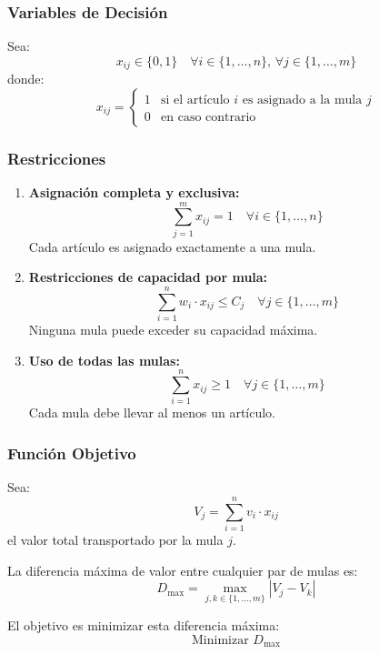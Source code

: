 \documentclass[12pt, a4paper]{article}
\begin{document}
    \subsubsection{Variables de Decisión}
    Sea:
    \[
    x_{ij} \in \{0,1\} \quad \forall i \in \{1,\ldots,n\}, \, \forall j \in \{1,\ldots,m\}
    \]
    donde:
    \[
    x_{ij} = \begin{cases}
    1 & \text{si el artículo } i \text{ es asignado a la mula } j \\
    0 & \text{en caso contrario}
    \end{cases}
    \]

    \subsubsection{Restricciones}
    \begin{enumerate}
        \item \textbf{Asignación completa y exclusiva:}
        \[
        \sum_{j=1}^{m} x_{ij} = 1 \quad \forall i \in \{1,\ldots,n\}
        \]
        Cada artículo es asignado exactamente a una mula.

        \item \textbf{Restricciones de capacidad por mula:}
        \[
        \sum_{i=1}^{n} w_i \cdot x_{ij} \leq C_j \quad \forall j \in \{1,\ldots,m\}
        \]
        Ninguna mula puede exceder su capacidad máxima.

        \item \textbf{Uso de todas las mulas:}
        \[
        \sum_{i=1}^{n} x_{ij} \geq 1 \quad \forall j \in \{1,\ldots,m\}
        \]
        Cada mula debe llevar al menos un artículo.
    \end{enumerate}

    \subsubsection{Función Objetivo}
    Sea:
    \[
    V_j = \sum_{i=1}^{n} v_i \cdot x_{ij}
    \]
    el valor total transportado por la mula $j$.

    La diferencia máxima de valor entre cualquier par de mulas es:
    \[
    D_{\max} = \max_{j,k \in \{1,\ldots,m\}} |V_j - V_k|
    \]

    El objetivo es minimizar esta diferencia máxima:
    \[
    \text{Minimizar } D_{\max}
    \]
\end{document}
